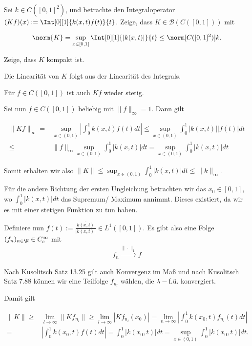 \begin{exercise}[IO/4]

Sei $k \in C([0, 1]^2)$, und betrachte den Integraloperator $(K f)(x) := \Int[0][1]{k(x, t)f(t)}{t}$.
Zeige, dass $K \in \mathcal{B}(C([0, 1]))$ mit

\begin{align*}
  \norm{K}
  =
  \sup_{x \in [0, 1]} \Int[0][1]{|k(x, t)|}{t}
  \leq
  \norm[{C([0, 1]^2)}]{k}.
\end{align*}

Zeige, dass $K$ kompakt ist.

\end{exercise}

\begin{solution}

Die Linearität von $K$ folgt aus der Linearität des Integrals.

Für $f \in C([0,1])$ ist auch $Kf$ wieder stetig.

Sei nun $f \in C([0,1])$ beliebig mit $\|f\|_{\infty} = 1$. Dann gilt

\begin{align*}
  \|Kf\|_{\infty} =& \sup_{x \in (0,1)} | \int_{0}^{1} k(x,t)f(t)dt | \leq \sup_{x \in (0,1)} \int_{0}^{1} |k(x,t)||f(t)|dt \\
  \leq& \|f\|_{\infty} \sup_{x \in (0,1)} \int_{0}^{1} |k(x,t)|dt = \sup_{x \in (0,1)} \int_{0}^{1} |k(x,t)|dt
\end{align*}

Somit erhalten wir also $\|K\| \leq \sup_{x \in (0,1)} \int_{0}^{1} |k(x,t)|dt \leq \|k\|_{\infty}$.

Für die andere Richtung der ersten Ungleichung betrachten wir das $x_0 \in [0,1]$, wo $\int_{0}^{1} |k(x,t)|dt$ das Supremum/ Maximum annimmt. Dieses existiert, da wir es mit einer stetigen Funktion zu tun haben.

Definiere nun $f(t) := \frac{\overline{k(x,t)}}{|k(x,t)|} \in L^1([0,1])$. Es gibt also eine Folge $(f_n)_{n \in \N} \in C_c^{\infty}$ mit
\begin{align*}
  f_n \stackrel{\|\cdot\|_1}{\to} f
\end{align*}

Nach Kusolitsch Satz 13.25 gilt auch Konvergenz im Maß und nach Kusolitsch Satz 7.88 können wir eine Teilfolge $f_{n_l}$ wählen, die $\lambda-$f.ü. konvergiert.

Damit gilt

\begin{align*}
  \|K\| \geq& \lim_{l \to \infty} \|Kf_{n_l}\| \geq \lim_{l \to \infty} |Kf_{n_l}(x_0)| = \lim_{n \to \infty} |\int_{0}^{1} k(x_0,t)f_{n_l}(t) dt| \\
  =& |\int_{0}^{1} k(x_0,t)f(t) dt| = \int_{0}^{1} |k(x_0,t)| dt = \sup_{x \in (0,1)} \int_{0}^{1} |k(x_0,t)| dt.
\end{align*}


\end{solution}
